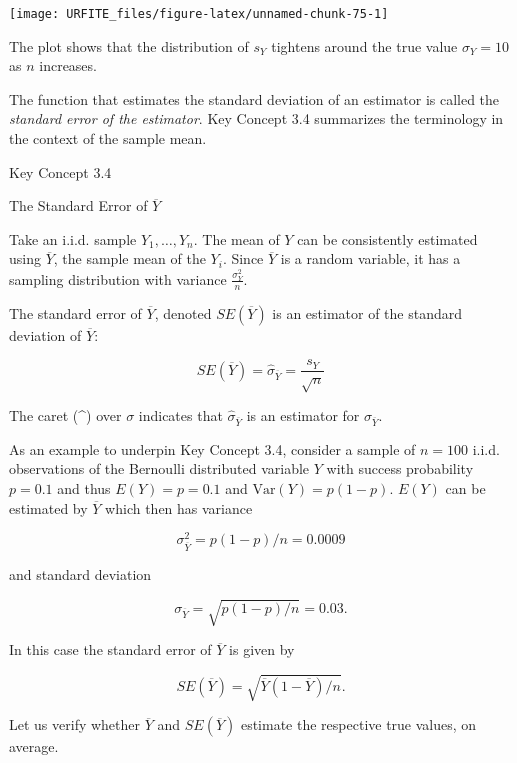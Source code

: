 \documentclass[]{book}
\theoremstyle{definition}
\theoremstyle{definition}
\theoremstyle{definition}
\theoremstyle{remark}
\begin{document}
\begin{center}\texttt{[image: URFITE\_files/figure-latex/unnamed-chunk-75-1]} \end{center}

The plot shows that the distribution of \(s_Y\) tightens around the true
value \(\sigma_Y = 10\) as \(n\) increases.

The function that estimates the standard deviation of an estimator is
called the \emph{standard error of the estimator}. Key Concept 3.4
summarizes the terminology in the context of the sample mean.

Key Concept 3.4

The Standard Error of \(\overline{Y}\)

Take an i.i.d. sample \(Y_1, \dots, Y_n\). The mean of \(Y\) can be
consistently estimated using \(\overline{Y}\), the sample mean of the
\(Y_i\). Since \(\overline{Y}\) is a random variable, it has a sampling
distribution with variance \(\frac{\sigma_Y^2}{n}\).

The standard error of \(\overline{Y}\), denoted \(SE(\overline{Y})\) is
an estimator of the standard deviation of \(\overline{Y}\):

\[ SE(\overline{Y}) = \hat\sigma_{\overline{Y}} = \frac{s_Y}{\sqrt{n}} \]

The caret (\^{}) over \(\sigma\) indicates that
\(\hat\sigma_{\overline{Y}}\) is an estimator for
\(\sigma_{\overline{Y}}\).

As an example to underpin Key Concept 3.4, consider a sample of
\(n=100\) i.i.d. observations of the Bernoulli distributed variable
\(Y\) with success probability \(p=0.1\) and thus \(E(Y)=p=0.1\) and
\(\text{Var}(Y)=p(1-p)\). \(E(Y)\) can be estimated by \(\overline{Y}\)
which then has variance

\[ \sigma^2_{\overline{Y}} = p(1-p)/n = 0.0009 \]

and standard deviation

\[ \sigma_{\overline{Y}} = \sqrt{p(1-p)/n} = 0.03. \]

In this case the standard error of \(\overline{Y}\) is given by

\[ SE(\overline{Y}) = \sqrt{\overline{Y}(1-\overline{Y})/n}. \]

Let us verify whether \(\overline{Y}\) and \(SE(\overline{Y})\) estimate
the respective true values, on average.
\end{document}
